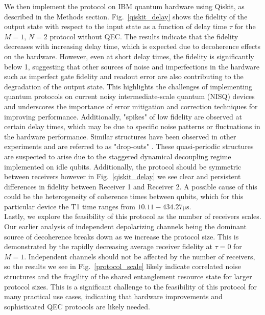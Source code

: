 We then implement the protocol on IBM quantum hardware using Qiskit, as described in the Methods section. Fig.~\ref{qiskit_delay} shows the fidelity of the output state with respect to the input state as a function of delay time $\tau$ for the $M{=}1$, $N{=}2$ protocol without QEC. The results indicate that the fidelity decreases with increasing delay time, which is expected due to decoherence effects on the hardware. However, even at short delay times, the fidelity is significantly below 1, suggesting that other sources of noise and imperfections in the hardware such as imperfect gate fidelity and readout error are also contributing to the degradation of the output state. This highlights the challenges of implementing quantum protocols on current noisy intermediate-scale quantum (NISQ) devices and underscores the importance of error mitigation and correction techniques for improving performance. Additionally, "spikes" of low fidelity are observed at certain delay times, which may be due to specific noise patterns or fluctuations in the hardware performance. Similar structures have been observed in other experiments and are referred to as "drop-outs" \cite{niu2024multi}. These quasi-periodic structures are suspected to arise due to the staggered dynamical decoupling regime implemented on idle qubits. Additionally, the protocol should be symmetric between receivers however in Fig.~\ref{qiskit_delay} we see clear and persistent differences in fidelity between Receiver 1 and Receiver 2. A possible cause of this could be the heterogeneity of coherence times between qubits, which for this particular device the T1 time ranges from $10.11-434.27\mathrm{\mu s}$\cite{javadi2024qiskit}.  \\
%

Lastly, we explore the feasibility of this protocol as the number of receivers scales. Our earlier analysis of independent depolarizing channels being the dominant source of decoherence breaks down as we increase the protocol size. This is demonstrated by the rapidly decreasing average receiver fidelity at $\tau=0$ for $M=1$. Independent channels should not be affected by the number of receivers, so the results we see in Fig.~\ref{protocol_scale} likely indicate correlated noise structures and the fragility of the shared entanglement resource state for larger protocol sizes. This is a significant challenge to the feasibility of this protocol for many practical use cases, indicating that hardware improvements and sophisticated QEC protocols are likely needed.


